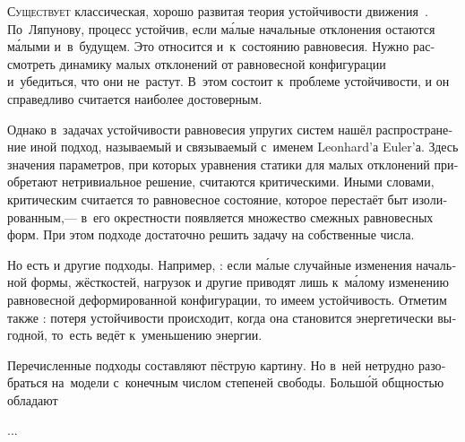 

\thispagestyle{empty}

\label{chapter:stability}



\begin{otherlanguage}{russian}

\lettrine[lines=2, findent=2pt, nindent=0pt]{С}{уществует} классическая, хорошо развитая теория устойчивости движения~\cite{merkin-stabilityintro}. По~Ляпунову, процесс устойчив, если м\'{а}лые начальные отклонения остаются м\'{а}лыми и~в~будущем. Это относится и~к~состоянию равновесия. Нужно рассмотреть динамику малых отклонений от равновесной конфигурации и~убедиться, что они не~растут. В~этом состоит  к~проблеме устойчивости, и он справедливо считается наиболее достоверным.

Однако в~задачах устойчивости равновесия упругих систем нашёл распространение иной подход, называемый  и связываемый с~именем Leonhard’а Euler’а. Здесь значения параметров, при которых уравнения статики для малых отклонений приобретают нетривиальное решение, считаются критическими. Иными словами, критическим считается то равновесное состояние, которое перестаёт быт изолированным,\:--- в~его окрестности появляется множество смежных равновесных форм. При этом подходе достаточно решить задачу на собственные числа.

Но есть и другие подходы. Например, : если м\'{а}лые случайные изменения начальной формы, жёсткостей, нагрузок и другие приводят лишь к~м\'{а}лому изменению равновесной деформированной конфигурации, то имеем устойчивость. Отметим также : потеря устойчивости происходит, когда она становится энергетически выгодной, то~есть ведёт к~уменьшению энергии.

Перечисленные подходы составляют пёструю картину. Но в~ней нетрудно разобраться на~модели с~конечным числом степеней свободы. Больш\'{о}й общностью обладают

...



\end{otherlanguage}


